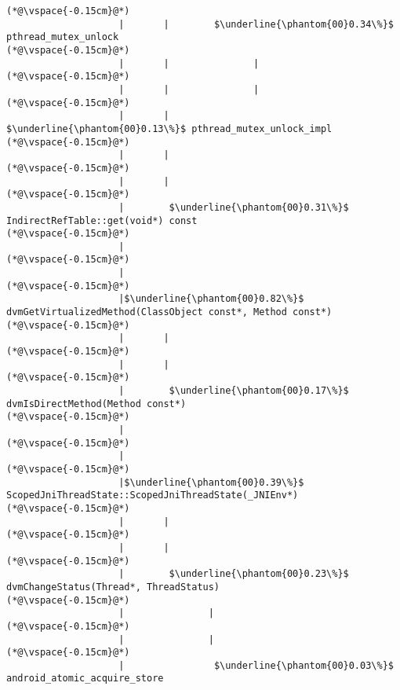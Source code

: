 \begin{lstlisting}[caption=20 viiteparametria (C$\to$Java) , label=profile:C2JBenchmark00206, numberbychapter=true, frame=lines, float, floatplacement=t]
(*@\vspace{-0.15cm}@*)
                    |       |        $\underline{\phantom{00}0.34\%}$ pthread_mutex_unlock
(*@\vspace{-0.15cm}@*)
                    |       |               |
(*@\vspace{-0.15cm}@*)
                    |       |               |
(*@\vspace{-0.15cm}@*)
                    |       |                $\underline{\phantom{00}0.13\%}$ pthread_mutex_unlock_impl
(*@\vspace{-0.15cm}@*)
                    |       |
(*@\vspace{-0.15cm}@*)
                    |       |
(*@\vspace{-0.15cm}@*)
                    |        $\underline{\phantom{00}0.31\%}$ IndirectRefTable::get(void*) const
(*@\vspace{-0.15cm}@*)
                    |
(*@\vspace{-0.15cm}@*)
                    |
(*@\vspace{-0.15cm}@*)
                    |$\underline{\phantom{00}0.82\%}$ dvmGetVirtualizedMethod(ClassObject const*, Method const*)
(*@\vspace{-0.15cm}@*)
                    |       |
(*@\vspace{-0.15cm}@*)
                    |       |
(*@\vspace{-0.15cm}@*)
                    |        $\underline{\phantom{00}0.17\%}$ dvmIsDirectMethod(Method const*)
(*@\vspace{-0.15cm}@*)
                    |
(*@\vspace{-0.15cm}@*)
                    |
(*@\vspace{-0.15cm}@*)
                    |$\underline{\phantom{00}0.39\%}$ ScopedJniThreadState::ScopedJniThreadState(_JNIEnv*)
(*@\vspace{-0.15cm}@*)
                    |       |
(*@\vspace{-0.15cm}@*)
                    |       |
(*@\vspace{-0.15cm}@*)
                    |        $\underline{\phantom{00}0.23\%}$ dvmChangeStatus(Thread*, ThreadStatus)
(*@\vspace{-0.15cm}@*)
                    |               |
(*@\vspace{-0.15cm}@*)
                    |               |
(*@\vspace{-0.15cm}@*)
                    |                $\underline{\phantom{00}0.03\%}$ android_atomic_acquire_store

\end{lstlisting}
